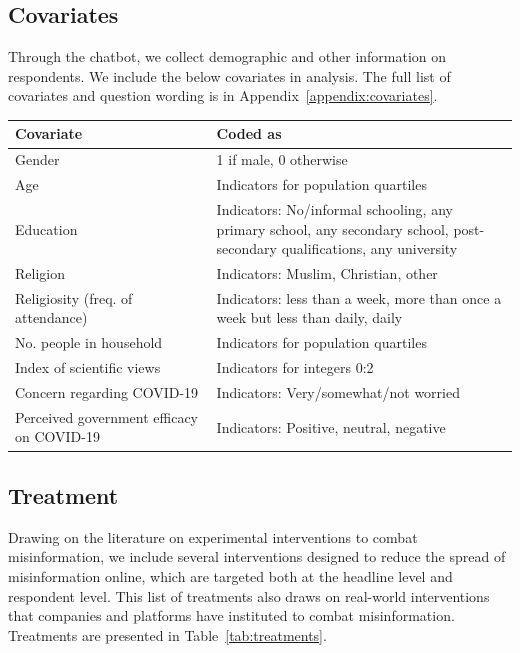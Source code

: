 \documentclass[letterpaper, 12pt, parskip=full,]{scrartcl}
\begin{document}
\subsection{Covariates}
Through the chatbot, we collect demographic and other information on respondents. 
We include the below covariates in analysis. The full list of covariates and question wording is in Appendix~\ref{appendix:covariates}. 
\begin{table}[H]
\begin{tabular}{p{0.4\linewidth}p{0.6\linewidth}}
\textbf{Covariate}                   & \textbf{Coded as}                                     \\
\hline
Gender                      & 1   if male, 0 otherwise                     \\
Age                         & Indicators   for population quartiles        \\
Education                                   & Indicators: No/informal schooling, any   primary school, any secondary school, post-secondary qualifications, any   university \\
Religion                    & Indicators: Muslim, Christian, other                     \\
Religiosity (freq. of attendance)                     & Indicators: less than a week, more than once   a week but less than daily, daily                                              \\
No.   people in household   & Indicators   for population quartiles        \\
Index   of scientific views & Indicators for integers 0:2                  \\
Concern regarding COVID-19  & Indicators: Very/somewhat/not worried \\
Perceived government efficacy   on COVID-19 & Indicators:  Positive,   neutral, negative                                                                     
\end{tabular}
\end{table}


\subsection{Treatment}
Drawing on the literature on experimental interventions to combat misinformation, we include several interventions designed to reduce the spread of misinformation online, which are targeted both at the headline level and respondent level. This list of treatments also draws on real-world interventions that companies and platforms have instituted to combat misinformation. Treatments are presented in Table~\ref{tab:treatments}. 
\end{document}
